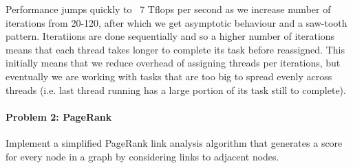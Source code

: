 \documentclass[12pt,letterpaper,twoside]{article}
\begin{document}
\begin{itemize}
    Performance jumps quickly to ~7 Tflops per second as we increase
    number of iterations from 20-120, after which we get asymptotic 
    behaviour and a saw-tooth pattern. Iteratiions are done sequentially
    and so a higher number of iterations means that each thread takes 
    longer to complete its task before reassigned. This initially means
    that we reduce overhead of assigning threads per iterations, but 
    eventually we are working with tasks that are too big to spread
    evenly across threads (i.e. last thread running has a large portion
    of its task still to complete).
    
\end{itemize}


\paragraph{Problem 2: PageRank} Implement a simplified PageRank link analysis
algorithm that generates a score for every node in a graph by considering 
links to adjacent nodes.
\end{document}
